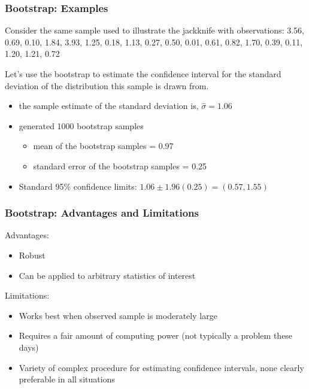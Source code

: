 \documentclass{beamer}
\begin{document}
\begin{frame}
  \frametitle{Bootstrap: Examples}
  
Consider the same sample used to illustrate the jackknife with observations: 3.56, 0.69, 0.10, 1.84, 3.93, 1.25, 0.18, 1.13, 0.27, 0.50, 0.01, 0.61, 0.82, 1.70, 0.39, 0.11, 1.20, 1.21, 0.72
\medskip

Let's use the bootstrap to estimate the confidence interval for the standard deviation of the distribution this sample is drawn from.
\smallskip

\begin{itemize}
    \item the sample estimate of the standard deviation is, $\widehat{\sigma} = 1.06$
    \item generated 1000 bootstrap samples
    \begin{itemize}
        \item mean of the bootstrap samples = 0.97
        \item standard error of the bootstrap samples = 0.25
    \end{itemize}
    \item Standard 95\% confidence limits: $1.06 \pm 1.96(0.25) = (0.57, 1.55)$
\end{itemize}
        

\end{frame}

\begin{frame}
  \frametitle{Bootstrap: Advantages and Limitations}

Advantages:
\begin{itemize}
    \item Robust
    \item Can be applied to arbitrary statistics of interest
\end{itemize}

Limitations:
\begin{itemize}
    \item Works best when observed sample is moderately large
    \item Requires a fair amount of computing power (not typically a problem these days)
    \item Variety of complex procedure for estimating confidence intervals, none clearly preferable in all situations
\end{itemize}

\end{frame}
\end{document}

